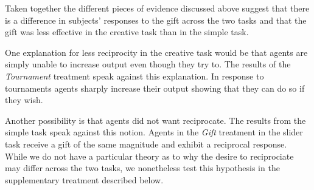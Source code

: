 \label{chap:analyses_mechanism}

Taken together the different pieces of evidence discussed above suggest that 
there is a difference in subjects' responses to the gift across the two tasks and that the gift was 
less effective in the creative task than in the simple task. 

One explanation for less reciprocity in the creative task would be that 
agents are simply unable to increase output even though they try to.
The results of the \textit{Tournament} treatment speak against this explanation. In response to tournaments 
agents sharply increase their output showing that they can do so if they wish. 


Another possibility is that agents did not want reciprocate. The results from the 
simple task speak  against this notion. Agents in the \textit{Gift} treatment in the slider task
receive a gift of the same magnitude and exhibit  a reciprocal response. While we do 
not have a particular theory as to why the desire to reciprociate may differ across the two tasks, 
we nonetheless test this hypothesis in the supplementary treatment described below. 


